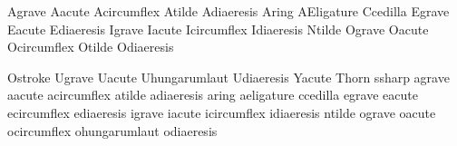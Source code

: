 

\startencoding[uc]

 Agrave        {}
 Aacute        {}
 Acircumflex   {}
 Atilde        {}
 Adiaeresis    {}
 Aring         {}
 AEligature    {}
 Ccedilla      {}
 Egrave        {}
 Eacute        {}
 Ediaeresis    {}
 Igrave        {}
 Iacute        {}
 Icircumflex   {}
 Idiaeresis    {}
 Ntilde        {}
 Ograve        {}
 Oacute        {}
 Ocircumflex   {}
 Otilde        {}
 Odiaeresis    {}

 Ostroke       {}
 Ugrave        {}
 Uacute        {}
 Uhungarumlaut {}
 Udiaeresis    {}
 Yacute        {}
 Thorn         {}
 ssharp        {}
 agrave        {}
 aacute        {}
 acircumflex   {}
 atilde        {}
 adiaeresis    {}
 aring         {}
 aeligature    {}
 ccedilla      {}
 egrave        {}
 eacute        {}
 ecircumflex   {}
 ediaeresis    {}
 igrave        {}
 iacute        {}
 icircumflex   {}
 idiaeresis    {}
 ntilde        {}
 ograve        {}
 oacute        {}
 ocircumflex   {}
 ohungarumlaut {}
 odiaeresis    {}

